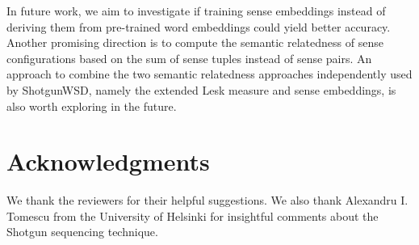 \documentclass[11pt]{article}
\begin{document}
In future work, we aim to investigate if training sense embeddings instead of deriving them from pre-trained word embeddings could yield better accuracy. Another promising direction is to compute the semantic relatedness of sense configurations based on the sum of sense tuples instead of sense pairs. An approach to combine the two semantic relatedness approaches independently used by ShotgunWSD, namely the extended Lesk measure and sense embeddings, is also worth exploring in the future.



\section*{Acknowledgments}
We thank the reviewers for their helpful suggestions. We also thank Alexandru I. Tomescu from the University of Helsinki for insightful comments about the Shotgun sequencing technique.



\end{document}
